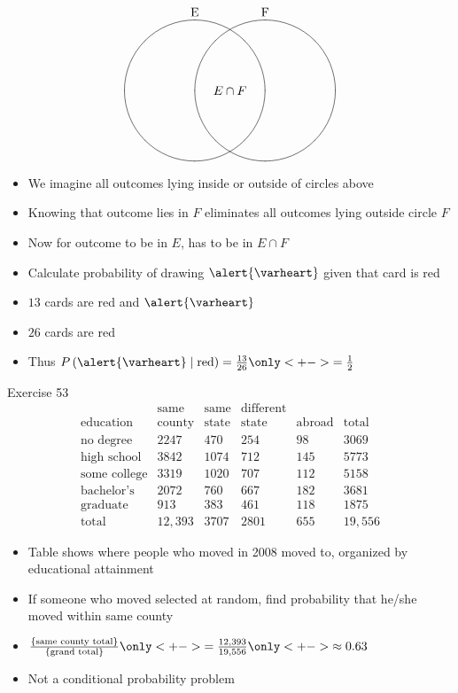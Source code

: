 \documentclass{beamer}
\theoremstyle{definition}
\begin{document}
\begin{frame}
\[\begin{xy}<1cm,0cm>:
(-1,2)*+!D{\text{E}};
(1,2)*+!D{\text{F}};
(-1,0)*\cir<2cm>{};
(1,0)*\cir<2cm>{};
(0,0)*{E\cap F};
\end{xy}\]
\begin{itemize}
\item We imagine all outcomes lying inside
or outside of circles above
\item Knowing that outcome lies in $F$
eliminates all outcomes lying outside circle $F$
\item Now for outcome to be in $E$, has to be in $E\cap F$
\end{itemize}
\end{frame}

\begin{frame}
\begin{example}
\begin{itemize}
\item Calculate probability of drawing $\alert{\varheart}$ given
that card is red
\item $13$ cards are red and $\alert{\varheart}$
\item $26$ cards are red
\item Thus $P\left(\alert{\varheart}\mid\text{red}\right)
=\frac{13}{26}\only<+->{=\frac{1}{2}}$
\end{itemize}
\end{example}
\end{frame}

\begin{frame}{Exercise 53}
\[\begin{array}{r|llll|l}
&\text{same}&\text{same}&\text{different}&&\\
\text{education}&\text{county}
&\text{state}&\text{state}&\text{abroad}&\text{total}\\\hline
\text{no degree}&2247&470&254&98&3069\\
\text{high school}&3842&1074&712&145&5773\\
\text{some college}&3319&1020&707&112&5158\\
\text{bachelor's}&2072&760&667&182&3681\\
\text{graduate}&913&383&461&118&1875\\\hline
\text{total}&12,393&3707&2801&655&19,556
\end{array}\]
\begin{itemize}
\item Table shows where people who moved in 2008
moved to, organized by educational attainment
\item If someone who moved selected at random, find probability
that he/she moved within same county
\item $\frac{\left\{\text{same county total}\right\}}
{\left\{\text{grand total}\right\}}
\only<+->{=\frac{12,393}{19,556}}\only<+->{\approx 0.63}$
\item Not a conditional probability problem
\end{itemize}
\end{frame}
\end{document}
